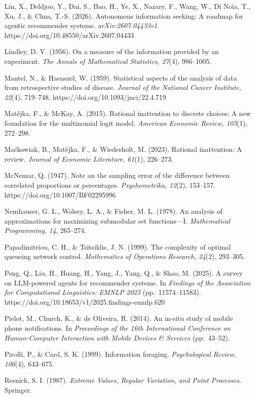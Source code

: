 \documentclass[
  11pt]{article}
\begin{document}
Lin, X., Deldjoo, Y., Dai, S., Bao, H., Ye, X., Nazary, F., Wang, W., Di
Noia, T., Xu, J., \& Chua, T.-S. (2026). Autonomous information seeking:
A roadmap for agentic recommender systems. \emph{arXiv:2607.04433v1}.
https://doi.org/10.48550/arXiv.2607.04433

Lindley, D. V. (1956). On a measure of the information provided by an
experiment. \emph{The Annals of Mathematical Statistics, 27}(4),
986--1005.

Mantel, N., \& Haenszel, W. (1959). Statistical aspects of the analysis
of data from retrospective studies of disease. \emph{Journal of the
National Cancer Institute, 22}(4), 719--748.
https://doi.org/10.1093/jnci/22.4.719

Matějka, F., \& McKay, A. (2015). Rational inattention to discrete
choices: A new foundation for the multinomial logit model.
\emph{American Economic Review, 105}(1), 272--298.

Maćkowiak, B., Matějka, F., \& Wiederholt, M. (2023). Rational
inattention: A review. \emph{Journal of Economic Literature, 61}(1),
226--273.

McNemar, Q. (1947). Note on the sampling error of the difference between
correlated proportions or percentages. \emph{Psychometrika, 12}(2),
153--157. https://doi.org/10.1007/BF02295996

Nemhauser, G. L., Wolsey, L. A., \& Fisher, M. L. (1978). An analysis of
approximations for maximizing submodular set functions---I.
\emph{Mathematical Programming, 14}, 265--274.

Papadimitriou, C. H., \& Tsitsiklis, J. N. (1999). The complexity of
optimal queueing network control. \emph{Mathematics of Operations
Research, 24}(2), 293--305.

Peng, Q., Liu, H., Huang, H., Yang, J., Yang, Q., \& Shao, M. (2025). A
survey on LLM-powered agents for recommender systems. In \emph{Findings
of the Association for Computational Linguistics: EMNLP 2025}
(pp.~11574--11583). https://doi.org/10.18653/v1/2025.findings-emnlp.620

Pielot, M., Church, K., \& de Oliveira, R. (2014). An in-situ study of
mobile phone notifications. In \emph{Proceedings of the 16th
International Conference on Human-Computer Interaction with Mobile
Devices \& Services} (pp.~43--52).

Pirolli, P., \& Card, S. K. (1999). Information foraging.
\emph{Psychological Review, 106}(4), 643--675.

Resnick, S. I. (1987). \emph{Extreme Values, Regular Variation, and
Point Processes}. Springer.
\end{document}
